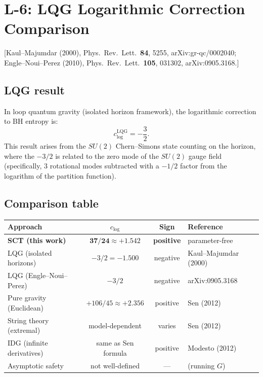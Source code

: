 \documentclass[12pt,a4paper]{article}
\theoremstyle{definition}
\theoremstyle{remark}
\newcommand{\fromlit}[1]{\textcolor{blue!70!black}{\textsf{[#1]}}}
\begin{document}
\section{L-6: LQG Logarithmic Correction Comparison}
\label{sec:L6}

\fromlit{Kaul--Majumdar (2000), Phys.\ Rev.\ Lett.~\textbf{84}, 5255,
arXiv:gr-qc/0002040;
Engle--Noui--Perez (2010), Phys.\ Rev.\ Lett.~\textbf{105}, 031302,
arXiv:0905.3168.}

\subsection{LQG result}

In loop quantum gravity (isolated horizon framework), the
logarithmic correction to BH entropy is:
\begin{equation}\label{eq:clog-lqg}
  c_{\log}^{\mathrm{LQG}} = -\frac{3}{2}.
\end{equation}
This result arises from the $SU(2)$ Chern--Simons state counting
on the horizon, where the $-3/2$ is related to the zero mode of
the $SU(2)$ gauge field (specifically, $3$ rotational modes
subtracted with a $-1/2$ factor from the logarithm of the
partition function).

\subsection{Comparison table}

\begin{center}
\begin{tabular}{lccl}
\toprule
Approach & $c_{\log}$ & Sign & Reference \\
\midrule
\textbf{SCT (this work)} & $\mathbf{37/24 \approx +1.542}$
  & \textbf{positive} & parameter-free \\
LQG (isolated horizons) & $-3/2 = -1.500$
  & negative & Kaul--Majumdar (2000) \\
LQG (Engle--Noui--Perez) & $-3/2$
  & negative & arXiv:0905.3168 \\
Pure gravity (Euclidean) & $+106/45 \approx +2.356$
  & positive & Sen (2012) \\
String theory (extremal) & model-dependent
  & varies & Sen (2012) \\
IDG (infinite derivatives) & same as Sen formula
  & positive & Modesto (2012) \\
Asymptotic safety & not well-defined
  & --- & (running $G$) \\
\bottomrule
\end{tabular}
\end{center}
\end{document}
